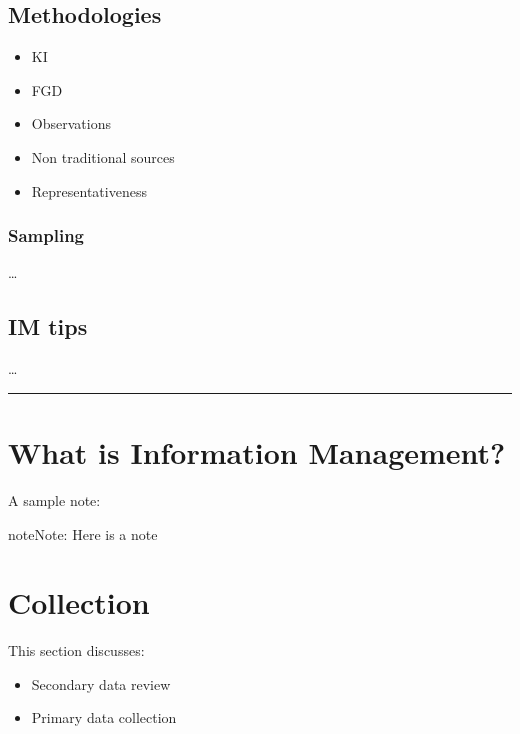 \documentclass[letterpaper,10pt,english]{jupyterBook}
\begin{document}
\section{Methodologies}
\label{\detokenize{part1/data literacy:methodologies}}\begin{itemize}
\item {} 
\sphinxAtStartPar
KI

\item {} 
\sphinxAtStartPar
FGD

\item {} 
\sphinxAtStartPar
Observations

\item {} 
\sphinxAtStartPar
Non traditional sources

\item {} 
\sphinxAtStartPar
Representativeness

\end{itemize}


\subsection{Sampling}
\label{\detokenize{part1/data literacy:sampling}}
\sphinxAtStartPar
…


\section{IM tips}
\label{\detokenize{part1/data literacy:im-tips}}
\sphinxAtStartPar
…


\bigskip\hrule\bigskip



\chapter{What is Information Management?}
\label{\detokenize{part1/what is information management:what-is-information-management}}\label{\detokenize{part1/what is information management::doc}}
\sphinxAtStartPar
A sample note:

\begin{sphinxadmonition}{note}{Note:}
\sphinxAtStartPar
Here is a note
\end{sphinxadmonition}


\chapter{Collection}
\label{\detokenize{part1/what is information management:collection}}
\sphinxAtStartPar
This section discusses:
\begin{itemize}
\item {} 
\sphinxAtStartPar
Secondary data review

\item {} 
\sphinxAtStartPar
Primary data collection

\end{itemize}
\end{document}
